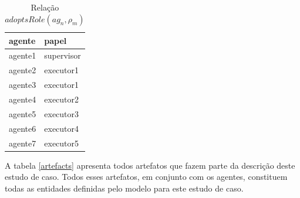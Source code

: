 \documentclass[12pt]{article}
\begin{document}
\begin{table}[H]
\centering
\begin{tabular}{|l|l|}
\hline
\textbf{agente} & \textbf{papel} \\ \hline
agente1 & supervisor \\ \hline
agente2 & executor1 \\ \hline
agente3 & executor1 \\ \hline
agente4 & executor2 \\ \hline
agente5 & executor3 \\ \hline
agente6 & executor4 \\ \hline
agente7 & executor5 \\ \hline
\end{tabular}
\caption{Relação $adoptsRole(ag_n,\rho_m)$}
\label{agentsroles}
\end{table}

A tabela \ref{artefacts} apresenta todos artefatos que fazem parte da descrição deste estudo de caso. Todos esses artefatos, em conjunto com os agentes, constituem todas as entidades definidas pelo modelo para este estudo de caso.
\end{document}
